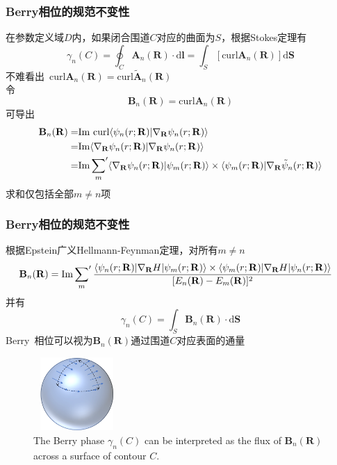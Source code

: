 {\frame
{
	\frametitle{\rm{Berry}相位的规范不变性}
	在参数定义域$D$内，如果闭合围道$C$对应的曲面为$S$，根据\textrm{Stokes}定理有
	\begin{displaymath}
		\gamma_n(C)=\oint_C\mathbf{A}_n(\mathbf{R})\cdot\mathrm{d}\mathbf{l}=\int_S[\mathrm{curl}\mathbf{A}_n(\mathbf{R})]\mathrm{d}\mathbf{S}
	\end{displaymath}
	不难看出~$\mathrm{curl}\mathbf{A}_n(\mathbf{R})=\mathrm{curl}\tilde{\mathbf{A}}_n(\mathbf{R})$\\
	令
	\begin{displaymath}
		\mathbf{B}_n(\mathbf{R})=\mathrm{curl}\mathbf{A}_n(\mathbf{R})
	\end{displaymath}
	可导出
	\begin{displaymath}
		\begin{aligned}
			\mathbf{B}_n(\mathbf{R})=&\mathrm{Im}~\mathrm{curl}\langle\psi_n(r;\mathbf{R})|\nabla_{\mathbf{R}}\psi_n(r;\mathbf{R})\rangle\\
			=&\mathrm{Im}\langle\nabla_{\mathbf{R}}\psi_n(r;\mathbf{R})|\nabla_{\mathbf{R}}\psi_n(r;\mathbf{R})\rangle\\
			=&\mathrm{Im}\sideset{}{^{\prime}}\sum_{m}\langle\nabla_{\mathbf{R}}\psi_n(r;\mathbf{R})|\psi_m(r;\mathbf{R})\rangle\times\langle\psi_m(r;\mathbf{R})|\nabla_{\mathbf{R}}\tilde{\psi}_n(r;\mathbf{R})\rangle\\
		\end{aligned}
	\end{displaymath}
	求和仅包括全部$m\neq n$项
}

\frame
{
	\frametitle{\rm{Berry}相位的规范不变性}
	根据\textrm{Epstein}广义\textrm{Hellmann-Feynman}定理，对所有$m\neq n$
	\begin{displaymath}
		\hspace*{-10pt}
		\mathbf{B}_n(\mathbf{R})=\mathrm{Im}\sideset{}{^{\prime}}\sum_{m}\dfrac{\langle\psi_n(r;\mathbf{R})|\nabla_{\mathbf{R}}H|\psi_m(r;\mathbf{R})\rangle\times\langle\psi_m(r;\mathbf{R})|\nabla_{\mathbf{R}}H|\psi_n(r;\mathbf{R})\rangle}{[E_n(\mathbf{R})-E_m(\mathbf{R})]^2}
	\end{displaymath}
	并有
	\begin{displaymath}
		\gamma_n(C)=\int_S\mathbf{B}_n(\mathbf{R})\cdot\mathrm{d}\mathbf{S}
	\end{displaymath}
	\textrm{Berry~}相位可以视为$\mathbf{B}_n(\mathbf{R})$通过围道$C$对应表面的通量
\begin{figure}[h!]
\centering
\vspace*{-0.05in}
\includegraphics[height=1.1in,width=1.3in,viewport=0 0 500 420,clip]{Figures/Berry_Phase-2.png}
\caption{\tiny \textrm{The Berry phase $\gamma_n(C)$ can be interpreted as the flux of $\mathbf{B}_n(\mathbf{R})$ across a surface of contour $C$.}}%
\label{Berry-Phase-2}
\end{figure} 
}

}
